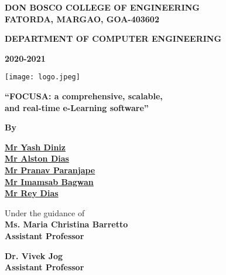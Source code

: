 \begin{titlepage}
    \begin{center}
        \Large
        \textbf{DON BOSCO COLLEGE OF ENGINEERING}\\
        \textbf{FATORDA, MARGAO, GOA-403602}

        \normalsize
        \textbf{DEPARTMENT OF COMPUTER ENGINEERING}\\

        \vfill
        
        \large
        \textbf{2020-2021}
        
        \texttt{[image: logo.jpeg]}

        \textbf{“FOCUSA: a comprehensive, scalable,\\
        and real-time e-Learning software”}

        \textbf{By}

        \normalsize
        \textbf{\underline{Mr Yash Diniz}}\\
        \textbf{\underline{Mr Alston Dias}}\\
        \textbf{\underline{Mr Pranav Paranjape}}\\
        \textbf{\underline{Mr Imamsab Bagwan}}\\
        \textbf{\underline{Mr Rey Dias}}\\

        \vfill
        
        Under the guidance of\\
        \textbf{Ms. Maria Christina Barretto}\\
        \textbf{Assistant Professor}\\

        \vfill

        \textbf{Dr. Vivek Jog}\\
        \textbf{Assistant Professor}

    \end{center}
    
\end{titlepage}